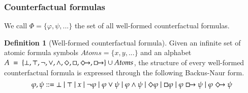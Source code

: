 \documentclass[a4paper,american]{paper}
\theoremstyle{definition}\newtheorem{definition}{Definition}
\begin{document}
\subsubsection{Counterfactual formulas}
We call $\Phi = \{\varphi ,\psi ,...\}$ the set of all well-formed counterfactual formulas.
\begin{definition}[Well-formed counterfactual formula]
Given an infinite set of atomic formula symbols $Atoms = \{ x, y, ...\}$ and an alphabet $A~=~\{\bot ,\top ,\neg ,\vee ,\wedge ,\Diamond ,\Box ,\Diamondright ,\boxright\}\cup Atoms$, the structure of every well-formed counterfactual formula is expressed through the following Backus-Naur form.
\begin{equation}
\varphi, \psi ::= \bot \mid \top \mid x \mid \neg \varphi \mid \varphi \vee \psi \mid \varphi \wedge \psi \mid \Diamond \varphi \mid \Box \varphi \mid \varphi \boxright \psi \mid \varphi \Diamondright \psi
\end{equation}
\end{definition}
\end{document}
